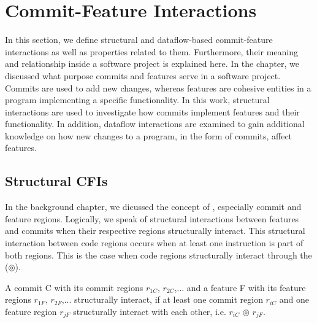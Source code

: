 \section{Commit-Feature Interactions}\label{ch:example_chapter}

In this section, we define structural and dataflow-based commit-feature interactions as well as properties related to them.
Furthermore, their meaning and relationship inside a software project is explained here. 
In the  chapter, we discussed what purpose commits and features serve in a software project.
Commits are used to add new changes, whereas features are cohesive entities in a program implementing a specific functionality.
In this work, structural interactions are used to investigate how commits implement features and their functionality.
In addition, dataflow interactions are examined to gain additional knowledge on how new changes to a program, in the form of commits, affect features. 

\subsection{Structural CFIs}\label{sec:structural_cfis}

In the background chapter, we dicussed the concept of , especially commit and feature regions. 
Logically, we speak of structural interactions between features and commits when their respective regions structurally interact. 
This structural interaction between code regions occurs when at least one instruction is part of both regions.
This is the case when code regions structurally interact through the  ($\circledcirc$).

\begin{definition}\label{def:structural_cfi}
A commit C with its commit regions $r_{1C}$, $r_{2C}$,... and a feature F with its feature regions $r_{1F}$, $r_{2F}$,... structurally interact, if at least one commit region $r_{iC}$ and one feature region $r_{jF}$ structurally interact with each other, i.e. $r_{iC}$ $\circledcirc$ $r_{jF}$.
\end{definition}

